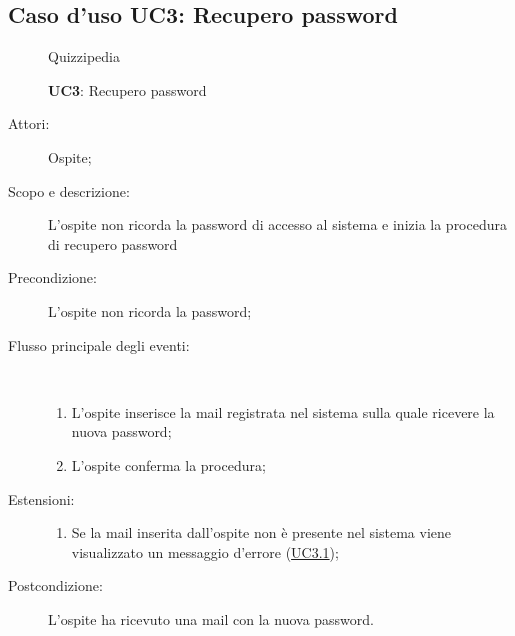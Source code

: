 \subsection{Caso d'uso UC3: Recupero password}
	\begin{figure}[H]
		\centering
		\begin{resizedtikzpicture}{\textwidth}
		\begin{umlsystem}[x=0, fill=lightgray!20]{Quizzipedia}
		\end{umlsystem}
		\end{resizedtikzpicture}
		\caption{\textbf{UC3}: Recupero password}
		\label{UC3}
	\end{figure}
\begin{description}
\item[Attori:] Ospite;
\item[Scopo e descrizione:] L'ospite non ricorda la password di accesso al sistema e inizia la procedura di recupero password 
      \item[Precondizione:] L'ospite non ricorda la password;

        \item[Flusso principale degli eventi:] \ 
 \begin{enumerate}
          \item L'ospite inserisce la mail registrata nel sistema sulla quale ricevere la nuova password;
          \item L'ospite conferma la procedura;

      \end{enumerate}
    \item[Estensioni:]
      \begin{enumerate}
          \item Se la mail inserita dall'ospite non è presente nel sistema viene visualizzato un messaggio d'errore (\hyperlink{UC3.1}{UC3.1});

      \end{enumerate}
    \item[Postcondizione:] L'ospite ha ricevuto una mail con la nuova password.
  \end{description}
\hypertarget{UC3.1}{}

